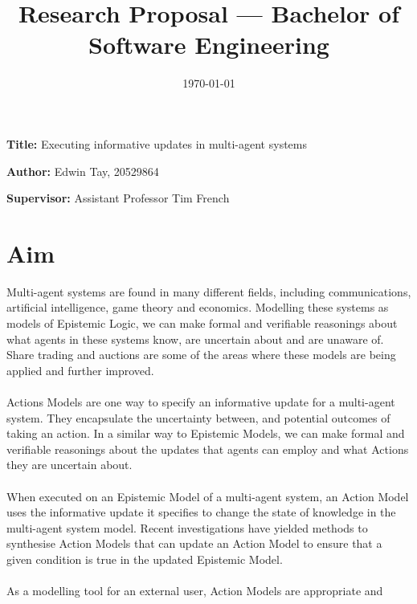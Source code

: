 \documentclass[12pt, a4paper]{article}
\title{Research Proposal --- Bachelor of Software Engineering}
\date{\today}
\newcommand{\namelistlabel}[1]{\mbox{#1}\hfil}
\newenvironment{namelist}[1]{%
\begin{list}{}
    {
        \let\makelabel\namelistlabel
        \settowidth{\labelwidth}{#1}
        \setlength{\leftmargin}{1.1\labelwidth}
    }
  }{%
\end{list}}
\begin{document}
\maketitle

\begin{namelist}{}
\item[{\bf Title:}]
  Executing informative updates in multi-agent systems
  \item[{\bf Author:}]
	Edwin Tay, 20529864
\item[{\bf Supervisor:}]
	Assistant Professor Tim French
\end{namelist}

\section*{Aim}
Multi-agent systems are found in many different fields, including
communications, artificial intelligence, game theory and economics.
Modelling these systems as models of Epistemic Logic, we can make formal and
verifiable reasonings about what agents in these systems know, are uncertain
about and are unaware of.
Share trading and auctions are some of the areas where these models are being
applied and further improved.\\
\\
Actions Models are one way to specify an informative update for a multi-agent
system.
They encapsulate the uncertainty between, and potential outcomes of taking an
action.
In a similar way to Epistemic Models, we can make formal and verifiable
reasonings about the updates that agents can employ and what Actions they are
uncertain about.\\
\\
When executed on an Epistemic Model of a multi-agent system, an Action Model
uses the informative update it specifies to change the state of knowledge in the
multi-agent system model.
Recent investigations have yielded methods to synthesise Action Models that can
update an Action Model to ensure that a given condition is true in the updated
Epistemic Model.\\
\\
As a modelling tool for an external user, Action Models are appropriate and
\end{document}
